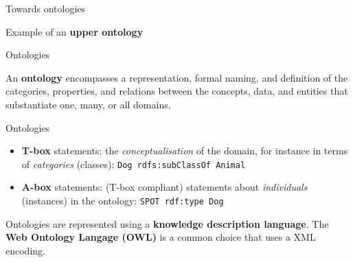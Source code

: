 \documentclass[compress,xcolor=table]{beamer}
\newcommand{\stmt}[1]{{\footnotesize \tt  #1}}
\begin{document}
\begin{frame}{Towards ontologies}
{\begin{figure}
{\begin{tikzpicture}
            \end{tikzpicture}
            }
    \end{figure}

    \large
    Example of an \textbf{upper ontology}

    }

\end{frame}


\begin{frame}{Ontologies}


    \centering
    \Large
     An \textbf{ontology} encompasses a representation, formal naming, and definition of the categories,
     properties, and relations between the concepts, data, and entities that
     substantiate one, many, or all domains.

     \normalsize



\end{frame}

\begin{frame}{Ontologies}

    \begin{itemize}
        \item \textbf{T-box} statements: the \emph{conceptualisation} of the
            domain, for instance in terms of \emph{categories} (classes): \stmt{Dog
            rdfs:subClassOf Animal}

        \item \textbf{A-box} statements: (T-box compliant) statements about
            \emph{individuals} (instances) in the ontology: \stmt{SPOT rdf:type Dog}

    \end{itemize}

    \pause

    Ontologies are represented using a \textbf{knowledge description language}.
    The \textbf{Web Ontology Langage (OWL)} is a common choice that uses a
    XML encoding.
\end{frame}
\end{document}
